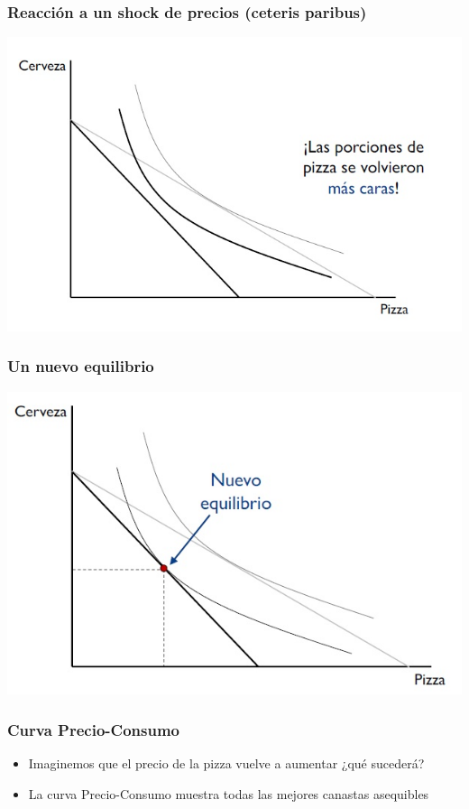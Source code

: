 \documentclass{beamer}
\begin{document}
\begin{frame}
\frametitle{Reacción a un shock de precios (ceteris paribus)}
\centering
\includegraphics[scale=0.65]{Figures/Tema_02.21_rp19.jpg}
\end{frame}

\begin{frame}
\frametitle{Un nuevo equilibrio}
\centering
\includegraphics[scale=0.65]{Figures/Tema_02.22_rp20.jpg}
\end{frame}

\begin{frame}
\frametitle{Curva Precio-Consumo}
\begin{itemize}
    \item Imaginemos que el precio de la pizza vuelve a aumentar ¿qué sucederá?  
    \item La curva Precio-Consumo muestra todas las mejores canastas asequibles 
\end{itemize}
\end{frame}
\end{document}
